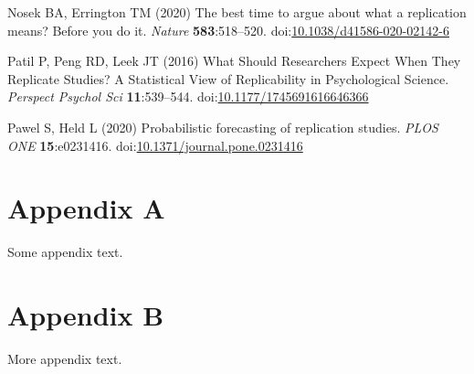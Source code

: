 \documentclass[
  english,
  a4paper,
]{article}
\newlength{\cslhangindent}
\newlength{\cslentryspacingunit} %
\newenvironment{CSLReferences}[2] %
 {%
  \setlength{\parindent}{0pt}
  \ifodd #1
  \let\oldpar\par
  \def\par{\hangindent=\cslhangindent\oldpar}
  \fi
  \setlength{\parskip}{#2\cslentryspacingunit}
 }%
 {}
\begin{document}
\begin{CSLReferences}{1}{0}
\leavevmode{}%
Nosek BA, Errington TM (2020) The best time to argue about what a replication means? {Before} you do it. \emph{Nature} \textbf{583}:518--520. doi:\href{https://doi.org/10.1038/d41586-020-02142-6}{10.1038/d41586-020-02142-6}

\leavevmode{}%
Patil P, Peng RD, Leek JT (2016) What {Should Researchers Expect When They Replicate Studies}? {A Statistical View} of {Replicability} in {Psychological Science}. \emph{Perspect Psychol Sci} \textbf{11}:539--544. doi:\href{https://doi.org/10.1177/1745691616646366}{10.1177/1745691616646366}

\leavevmode{}%
Pawel S, Held L (2020) Probabilistic forecasting of replication studies. \emph{PLOS ONE} \textbf{15}:e0231416. doi:\href{https://doi.org/10.1371/journal.pone.0231416}{10.1371/journal.pone.0231416}

\end{CSLReferences}

\hypertarget{appendix-appendices}{%
\appendix}


\hypertarget{appendix-a}{%
\section*{Appendix A}\label{appendix-a}}

Some appendix text.

\hypertarget{appendix-b}{%
\section*{Appendix B}\label{appendix-b}}

More appendix text.
\end{document}

